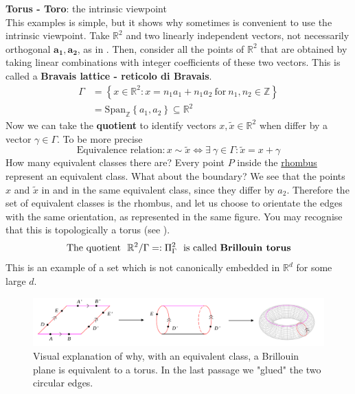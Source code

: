 \documentclass[../main.tex]{subfiles}
\begin{document}
\begin{example}
\textbf{Torus - Toro}: the intrinsic viewpoint\\
This examples is simple, but it shows why sometimes is convenient to use the intrinsic viewpoint. Take $\mathbb{R}^2$ and two linearly independent vectors, not necessarily orthogonal $\mathbf{a_1},\mathbf{a_2}$, as in . Then, consider all the points of $\mathbb{R}^2$ that are obtained by taking linear combinations with integer coefficients of these two vectors. This is called a \textbf{Bravais lattice - reticolo di Bravais}.
\[
\begin{split}
    \Gamma 
    &= \left\{x\in \mathbb{R}^2: x = n_1a_1+n_1a_2 \ \textrm{for} \ n_1,n_2\in \mathbb{Z}\right\}\\
    &=\textrm{Span}_{\mathbb{Z}}\left\{a_1,a_2\right\}\subseteq\mathbb{R}^2
\end{split}
\]
Now we can take the \textbf{quotient} to identify vectors $x,\tilde{x}\in\mathbb{R}^2$ when differ by a vector $\gamma\in\Gamma$. To be more precise
\[
\textrm{Equivalence relation}: x\sim \tilde{x} \Leftrightarrow \exists \ \gamma \in \Gamma: \tilde{x}=x+\gamma
\]
How many equivalent classes there are? Every point $P$ inside the \href{https://it.wikipedia.org/wiki/Rombo_(geometria)}{rhombus} represent an equivalent class. What about the boundary? We see that the points $x$ and $\tilde{x}$ in  and in the same equivalent class, since they differ by $a_2$. Therefore the set of equivalent classes is the rhombus, and let us choose to orientate the edges with the same orientation, as represented in the same figure. You may recognise that this is topologically a torus (see ).
\[
\textrm{The quotient }\  \mathbb{R}^2/\Gamma =: \Pi^2_{\Gamma} \ \textrm{ is called \textbf{Brillouin torus}}
\]
This is an example of a set which is not canonically embedded in $\mathbb{R}^d$ for some large $d$. 
\end{example}
\begin{figure}[h!]
	\includegraphics{images/construction_torus.pdf}
	\caption[How to construct a torus]{Visual explanation of why, with an equivalent class, a Brillouin plane is equivalent to a torus. In the last passage we "glued" the two circular edges.}
\end{figure}
\end{document}
